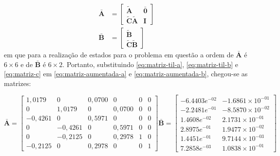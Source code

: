 \begin{subequations}
    \begin{align}
        \mathbf{\bar{A}} &=
        \begin{bmatrix}
            \label{eq:matriz-aumentada-a}
            \mathbf{\tilde{A}} & \mathbf{\bar{0}}\\ 
            \mathbf{\tilde{C}}\mathbf{\tilde{A}} & \mathbf{I}
        \end{bmatrix}   \\
        \mathbf{\bar{B}} &=
        \begin{bmatrix}
            \label{eq:matriz-aumentada-b}
            \mathbf{\tilde{B}}\\ 
            \mathbf{\tilde{C}}\mathbf{\tilde{B}}
        \end{bmatrix}
    \end{align}
\end{subequations} em que para a realização de estados para o problema em
questão a ordem de $\mathbf{\bar{A}}$ é $6 \times 6$ e de $\mathbf{\bar{B}}$ é
$6 \times 2$. Portanto, substituindo \ref{eq:matriz-til-a},
\ref{eq:matriz-til-b} e \ref{eq:matriz-c} em \ref{eq:matriz-aumentada-a} e
\ref{eq:matriz-aumentada-b}, chegou-se as matrizes:

\begin{subequations}
        \begin{equation}
            \label{eq:matriz-aumentanda-a-com-valores}
            \mathbf{\bar{A}} =
            \begin{bmatrix}
                1,0179  &  0       &  0,0700  &  0       & 0       & 0      \\
                0       &  1,0179  &  0       &  0,0700  & 0       & 0      \\
                -0,4261 &  0       &  0,5971  &  0       & 0       & 0      \\
                0       &  -0,4261 &  0       &  0,5971  & 0       & 0      \\
                0       &  -0,2125 &  0       &  0,2978  & 1       & 0      \\
                -0,2125 &  0       &  0,2978  &  0       & 0       & 1
            \end{bmatrix}
        \end{equation}    
        \begin{equation}
            \label{eq:matriz-aumentanda-b-com-valores}
            \mathbf{\bar{B}} =
            \begin{bmatrix}
                -6.4403e^{-02} & -1.6861\times10^{-01} \\
                -2.2481e^{-01} & -8.5870\times10^{-02} \\
                1.4608e^{-02} &  2.1731\times10^{-01}  \\
                2.8975e^{-01} &  1.9477\times10^{-02}  \\
                1.4451e^{-01} &  9.7144\times10^{-03}  \\
                7.2858e^{-03} &  1.0838\times10^{-01}
            \end{bmatrix}
        \end{equation}
\end{subequations}

